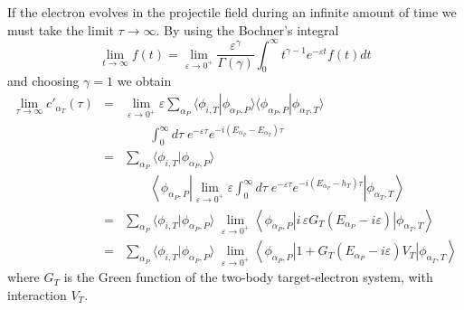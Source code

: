 If the electron evolves in the projectile field during an infinite
amount of time we must take the limit $\tau \to \infty$. By using the
Bochner's integral
%
\begin{equation}\label{Q:Bochn-integ}
\lim_{t \to \infty} f(t) = \lim_{\varepsilon \to 0^{+}}
\frac{\varepsilon^{\gamma}}{\Gamma(\gamma)} \int_{0}^{\infty}
t^{\gamma-1} e^{- \varepsilon t} f(t) d t
\end{equation}
%
and choosing $\gamma = 1$ we obtain
%
\begin{eqnarray}\label{Q:limit-infinit-time}
\lim_{\tau \to \infty} c'_{\alpha_{T}}(\tau)\!\! &=&\!\!
\lim_{\varepsilon \to 0^{+}} \varepsilon \sum_{\alpha_{P}} \langle
\phi_{i,T} | \phi_{\alpha_{P},P} \rangle  \langle \phi_{\alpha_{P},P} |
\phi_{\alpha_{T},T} \rangle \;
\nonumber \\
&& \quad \quad \int_{0}^{\infty} d \tau \; e^{- \varepsilon \tau}
e^{- i (E_{\alpha_{P}} - E_{\alpha_{T}}) \tau}  \nonumber
\\
&=& \sum_{\alpha_{P}} \langle \phi_{i,T} | \phi_{\alpha_{P},P} \rangle
\nonumber \\
&&\quad \quad \left\langle \phi_{\alpha_{P},P} \left|\lim_{\varepsilon
\to 0^{+}} \varepsilon  \int_{0}^{\infty} d \tau \; e^{-
\varepsilon \tau} e^{- i (E_{\alpha_{P}} - h_{T}) \tau} \right|
\phi_{\alpha_{T},T} \right\rangle \nonumber
\\
&=& \sum_{\alpha_{P}} \langle \phi_{i,T} | \phi_{\alpha_{P},P} \rangle
\;  \lim_{\varepsilon \to 0^{+}} \left\langle \phi_{\alpha_{P},P}
\left|i \, \varepsilon G_{T}(E_{\alpha_{P}}-i \varepsilon)
\right| \phi_{\alpha_{T},T} \right\rangle  \nonumber
\\
&=& \sum_{\alpha_{P}} \langle \phi_{i,T} | \phi_{\alpha_{P},P} \rangle
\;  \lim_{\varepsilon \to 0^{+}} \left\langle \phi_{\alpha_{P},P}
\left|1 + G_{T}(E_{\alpha_{P}}-i \varepsilon) V_{T} \right|
\phi_{\alpha_{T},T} \right\rangle   \nonumber
\end{eqnarray}
%
where $G_{T}$ is the Green function of the two-body target-electron
system, with interaction $V_{T}$.
